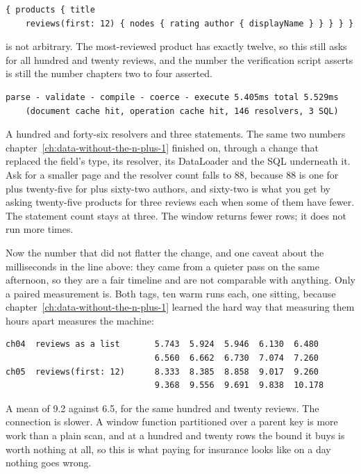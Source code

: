 \begin{verbatim}
{ products { title
    reviews(first: 12) { nodes { rating author { displayName } } } } }
\end{verbatim}

 is not arbitrary. The most-reviewed product has exactly twelve,
so this still asks for all hundred and twenty reviews, and the number the
verification script asserts is still the number chapters two to four asserted.

\begin{verbatim}
parse - validate - compile - coerce - execute 5.405ms total 5.529ms
    (document cache hit, operation cache hit, 146 resolvers, 3 SQL)
\end{verbatim}

A hundred and forty-six resolvers and three statements. The same two numbers
chapter~\ref{ch:data-without-the-n-plus-1} finished on, through a change that
replaced the field's type, its resolver, its DataLoader and the SQL underneath
it. Ask for a smaller page and the resolver count falls to 88, because 88 is one
for  plus twenty-five for  plus sixty-two authors,
and sixty-two is what you get by asking twenty-five products for three reviews
each when some of them have fewer. The statement count stays at three. The
window returns fewer rows; it does not run more times.

Now the number that did not flatter the change, and one caveat about the
milliseconds in the line above: they came from a quieter pass on the same
afternoon, so they are a fair timeline and are not comparable with anything.
Only a paired measurement is. Both tags, ten warm runs each, one sitting,
because chapter~\ref{ch:data-without-the-n-plus-1} learned the hard way that
measuring them hours apart measures the machine:

\begin{verbatim}
ch04  reviews as a list       5.743  5.924  5.946  6.130  6.480
                              6.560  6.662  6.730  7.074  7.260
ch05  reviews(first: 12)      8.333  8.385  8.858  9.017  9.260
                              9.368  9.556  9.691  9.838  10.178
\end{verbatim}

%
A mean of 9.2 against 6.5, for the same hundred
and twenty reviews. The connection is slower. A window function partitioned over
a parent key is more work than a plain scan, and at a hundred and twenty rows
the bound it buys is worth nothing at all, so this is what paying for insurance
looks like on a day nothing goes wrong.

